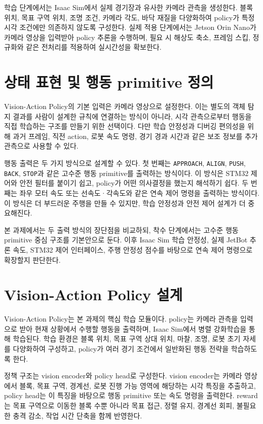 \documentclass[titlepage]{pnureport}
\begin{document}
학습 단계에서는 Isaac Sim에서 실제 경기장과 유사한 카메라 관측을 생성한다. 블록 위치, 목표 구역 위치, 조명 조건, 카메라 각도, 바닥 재질을 다양화하여 policy가 특정 시각 조건에만 의존하지 않도록 구성한다. 실제 적용 단계에서는 Jetson Orin Nano가 카메라 영상을 입력받아 policy 추론을 수행하며, 필요 시 해상도 축소, 프레임 스킵, 정규화와 같은 전처리를 적용하여 실시간성을 확보한다.

\section{상태 표현 및 행동 primitive 정의}

Vision-Action Policy의 기본 입력은 카메라 영상으로 설정한다. 이는 별도의 객체 탐지 결과를 사람이 설계한 규칙에 연결하는 방식이 아니라, 시각 관측으로부터 행동을 직접 학습하는 구조를 만들기 위한 선택이다. 다만 학습 안정성과 디버깅 편의성을 위해 과거 프레임, 직전 action, 로봇 속도 명령, 경기 경과 시간과 같은 보조 정보를 추가 관측으로 사용할 수 있다.

행동 출력은 두 가지 방식으로 설계할 수 있다. 첫 번째는 \texttt{APPROACH}, \texttt{ALIGN}, \texttt{PUSH}, \texttt{BACK}, \texttt{STOP}과 같은 고수준 행동 primitive를 출력하는 방식이다. 이 방식은 STM32 제어와 안전 필터를 붙이기 쉽고, policy가 어떤 의사결정을 했는지 해석하기 쉽다. 두 번째는 좌우 모터 속도 또는 선속도·각속도와 같은 연속 제어 명령을 출력하는 방식이다. 이 방식은 더 부드러운 주행을 만들 수 있지만, 학습 안정성과 안전 제어 설계가 더 중요해진다.

본 과제에서는 두 출력 방식의 장단점을 비교하되, 착수 단계에서는 고수준 행동 primitive 중심 구조를 기본안으로 둔다. 이후 Isaac Sim 학습 안정성, 실제 JetBot 추론 속도, STM32 제어 인터페이스, 주행 안정성 점수를 바탕으로 연속 제어 명령으로 확장할지 판단한다.

\section{Vision-Action Policy 설계}

Vision-Action Policy는 본 과제의 핵심 학습 모듈이다. policy는 카메라 관측을 입력으로 받아 현재 상황에서 수행할 행동을 출력하며, Isaac Sim에서 병렬 강화학습을 통해 학습된다. 학습 환경은 블록 위치, 목표 구역 상대 위치, 마찰, 조명, 로봇 초기 자세를 다양화하여 구성하고, policy가 여러 경기 조건에서 일반화된 행동 전략을 학습하도록 한다.

정책 구조는 vision encoder와 policy head로 구성한다. vision encoder는 카메라 영상에서 블록, 목표 구역, 경계선, 로봇 진행 가능 영역에 해당하는 시각 특징을 추출하고, policy head는 이 특징을 바탕으로 행동 primitive 또는 속도 명령을 출력한다. reward는 목표 구역으로 이동한 블록 수뿐 아니라 목표 접근, 정렬 유지, 경계선 회피, 불필요한 충격 감소, 작업 시간 단축을 함께 반영한다.
\end{document}
